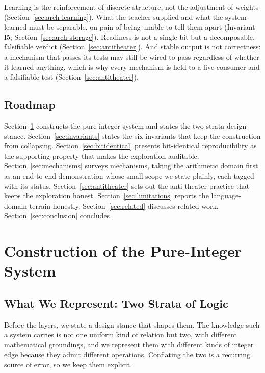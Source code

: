\documentclass[11pt,a4paper]{article}
\begin{document}
Learning is the reinforcement of discrete structure, not the adjustment
of weights (Section~\ref{sec:arch-learning}). What the teacher supplied
and what the system learned must be separable, on pain of being unable to
tell them apart (Invariant I5; Section~\ref{sec:arch-storage}). Readiness
is not a single bit but a decomposable, falsifiable verdict
(Section~\ref{sec:antitheater}). And stable output is not correctness: a
mechanism that passes its tests may still be wired to pass regardless of
whether it learned anything, which is why every mechanism is held to a
live consumer and a falsifiable test (Section~\ref{sec:antitheater}).

\subsection{Roadmap}
\label{sec:intro-roadmap}
Section~\ref{sec:arch} constructs the pure-integer system and states the
two-strata design stance. Section~\ref{sec:invariants} states the six
invariants that keep the construction from collapsing.
Section~\ref{sec:bitidentical} presents bit-identical reproducibility as
the supporting property that makes the exploration auditable.
Section~\ref{sec:mechanisms} surveys mechanisms, taking the arithmetic
domain first as an end-to-end demonstration whose small scope we state
plainly, each tagged with its status.
Section~\ref{sec:antitheater} sets out the anti-theater practice that
keeps the exploration honest. Section~\ref{sec:limitations} reports the
language-domain terrain honestly. Section~\ref{sec:related} discusses
related work.
Section~\ref{sec:conclusion} concludes.

\section{Construction of the Pure-Integer System}
\label{sec:arch}

\subsection{What We Represent: Two Strata of Logic}
\label{sec:arch-strata}

Before the layers, we state a design stance that shapes them. The
knowledge such a system carries is not one uniform kind of relation but
two, with different mathematical groundings, and we represent them with
different kinds of integer edge because they admit different operations.
Conflating the two is a recurring source of error, so we keep them
explicit.
\end{document}
